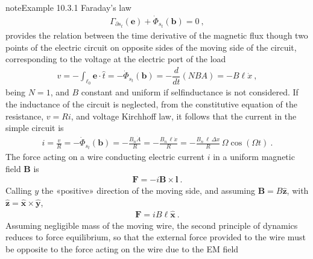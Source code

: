 \documentclass[letterpaper,10pt,italian]{jupyterBook}
\begin{document}
\begin{sphinxadmonition}{note}{Example 10.3.1}
\sphinxAtStartPar
{} Faraday’s law
\begin{equation*}
\begin{split}\Gamma_{\partial s_t}(\mathbf{e}) + \dot{\Phi}_{s_t}(\mathbf{b}) = 0 \ ,\end{split}
\end{equation*}
\sphinxAtStartPar
provides the relation between the time derivative of the magnetic flux though two points of the electric circuit on opposite sides of the moving side of the circuit, corresponding to the voltage at the electric port of the load
\begin{equation*}
\begin{split}v = - \int_{\ell_0} \mathbf{e} \cdot \hat{t} = - \dot{\Phi}_{s_t}(\mathbf{b}) = - \dfrac{d}{dt} \left( N B A \right) = - B \ell \dot{x} \ ,\end{split}
\end{equation*}
\sphinxAtStartPar
being \(N = 1\), and \(B\) constant and uniform if self\sphinxhyphen{}inductance is not considered.
If the inductance of the circuit is neglected, from the constitutive equation of the resistance, \(v = R i\), and voltage Kirchhoff law, it follows that the current in the simple circuit is
\begin{equation*}
\begin{split}i = \frac{v}{R} = - \dot{\Phi}_{s_t}(\mathbf{b}) = - \frac{B_n \dot{A}}{R} = - \frac{B_n \, \ell \dot{x}}{R} = - \frac{B_n \, \ell \, \Delta x}{R} \, \Omega \cos(\Omega t) \ .\end{split}
\end{equation*}
\sphinxAtStartPar
The force acting on a wire conducting electric current \(i\) in a uniform magnetic field \(\mathbf{B}\) is
\begin{equation*}
\begin{split}\mathbf{F} = - i \mathbf{B} \times \mathbf{l} \ .\end{split}
\end{equation*}
\sphinxAtStartPar
Calling \(y\) the «positive» direction of the moving side, and assuming \(\mathbf{B} = B \hat{\mathbf{z}}\), with \(\hat{\mathbf{z}} = \hat{\mathbf{x}} \times \hat{\mathbf{y}}\),
\begin{equation*}
\begin{split}\mathbf{F} = i B \ell \hat{\mathbf{x}} \ .\end{split}
\end{equation*}
\sphinxAtStartPar
Assuming negligible mass of the moving wire, the second principle of dynamics reduces to force equilibrium, so that the external force provided to the wire must be opposite to the force acting on the wire due to the EM field

\end{sphinxadmonition}
\end{document}
